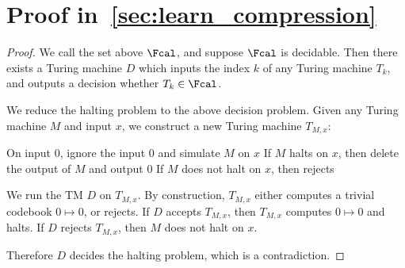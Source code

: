 \section{Proof in~\texorpdfstring{\cref{sec:learn_compression}}{reference}}\label{sec:proof_undecidable}
\FCMundecidable*
\begin{proof}
We call the set above $\Fcal$, and suppose $\Fcal$ is decidable. Then there exists a Turing machine $D$ which inputs the index $k$ of any Turing machine $T_k$, and outputs a decision whether $T_k \in \Fcal$.

We reduce the halting problem to the above decision problem. Given any Turing machine $M$ and input $x$, we construct a new Turing machine $T_{M,x}$:
\begin{algorithmic}
\ttfamily
\State On input $0$, ignore the input $0$ and simulate $M$ on $x$
    \State If $M$ halts on $x$, then delete the output of $M$ and output $0$
    \State If $M$ does not halt on $x$, then rejects
\end{algorithmic}
We run the TM $D$ on $T_{M,x}$. By construction, $T_{M,x}$ either computes a trivial codebook $0\mapsto 0$, or rejects. If $D$ accepts $T_{M,x}$, then $T_{M,x}$ computes $0\mapsto 0$ and halts. If $D$ rejects $T_{M,x}$, then $M$ does not halt on $x$.

Therefore $D$ decides the halting problem, which is a contradiction.
\end{proof}